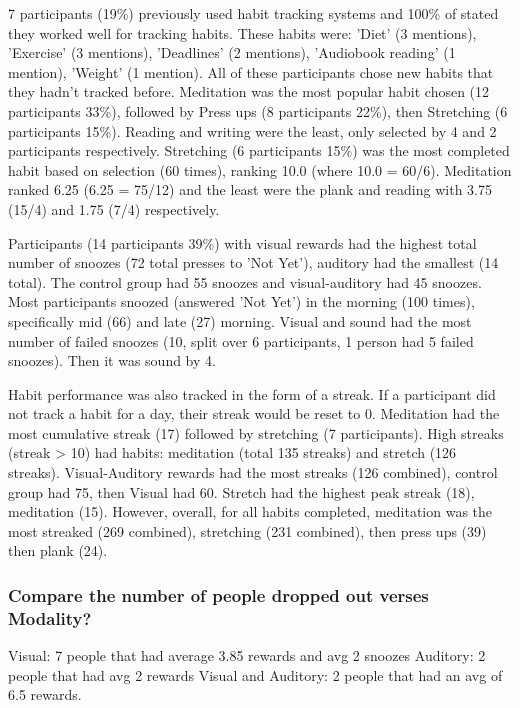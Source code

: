 7 participants (19\%) previously used habit tracking systems and 100\% of stated they worked well for tracking habits. These habits were: 'Diet' (3 mentions), 'Exercise' (3 mentions), 'Deadlines' (2 mentions), 'Audiobook reading' (1 mention), 'Weight' (1 mention). All of these participants chose new habits that they hadn't tracked before. Meditation was the most popular habit chosen (12 participants 33\%), followed by Press ups (8 participants 22\%), then Stretching (6 participants 15\%). Reading and writing were the least, only selected by 4 and 2 participants respectively. Stretching (6 participants 15\%) was the most completed habit based on selection (60 times), ranking 10.0 (where 10.0 = 60/6). Meditation ranked 6.25 (6.25 = 75/12) and the least were the plank and reading with 3.75 (15/4) and 1.75 (7/4) respectively.

Participants (14 participants 39\%) with visual rewards had the highest total number of snoozes (72 total presses to 'Not Yet'), auditory had the smallest (14 total). The control group had 55 snoozes and visual-auditory had 45 snoozes. Most participants snoozed (answered 'Not Yet') in the morning (100 times), specifically mid (66) and late (27) morning. Visual and sound had the most number of failed snoozes (10, split over 6 participants, 1 person had 5 failed snoozes). Then it was sound by 4.

Habit performance was also tracked in the form of a streak. If a participant did not track a habit for a day, their streak would be reset to 0. Meditation had the most cumulative streak (17) followed by stretching (7 participants). High streaks (streak > 10) had habits: meditation (total 135 streaks) and stretch (126 streaks). Visual-Auditory rewards had the most streaks (126 combined), control group had 75, then Visual had 60. Stretch had the highest peak streak (18), meditation (15). However, overall, for all habits completed, meditation was the most streaked (269 combined), stretching (231 combined), then press ups (39) then plank (24).

\subsubsection*{Compare the number of people dropped out verses Modality?}
Visual: 7 people that had average 3.85 rewards and avg 2 snoozes\newline
Auditory: 2 people that had avg 2 rewards\newline
Visual and Auditory: 2 people that had an avg of 6.5 rewards.

